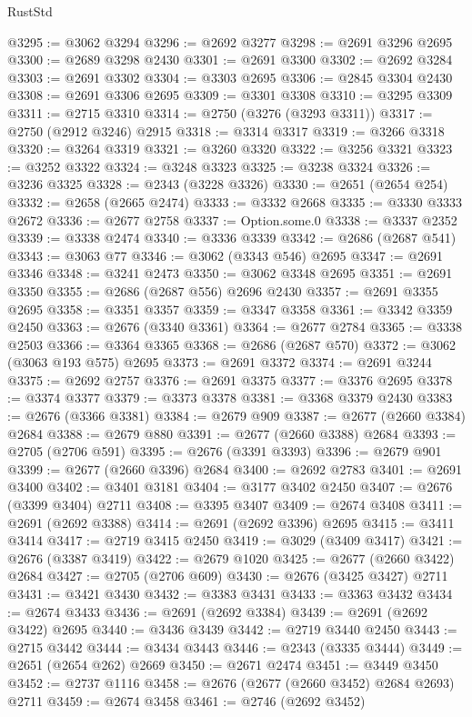 \begin{lexlean}{RustStd}
\begin{coremodule}
{\begin{coremodule}
{{{{{{{{{{{{{{{{{{{{{{{{{{{{{{{{{{{{{{{{{{{{{{{{{{{{{{{@3295 := @3062 @3294
@3296 := @2692 @3277
@3298 := @2691 @3296 @2695
@3300 := @2689 @3298 @2430
@3301 := @2691 @3300
@3302 := @2692 @3284
@3303 := @2691 @3302
@3304 := @3303 @2695
@3306 := @2845 @3304 @2430
@3308 := @2691 @3306 @2695
@3309 := @3301 @3308
@3310 := @3295 @3309
@3311 := @2715 @3310
@3314 := @2750 (@3276 (@3293 @3311))
@3317 := @2750 (@2912 @3246) @2915
@3318 := @3314 @3317
@3319 := @3266 @3318
@3320 := @3264 @3319
@3321 := @3260 @3320
@3322 := @3256 @3321
@3323 := @3252 @3322
@3324 := @3248 @3323
@3325 := @3238 @3324
@3326 := @3236 @3325
@3328 := @2343 (@3228 @3326)
@3330 := @2651 (@2654 @254)
@3332 := @2658 (@2665 @2474)
@3333 := @3332 @2668
@3335 := @3330 @3333 @2672
@3336 := @2677 @2758
@3337 := Option.some.{0}
@3338 := @3337 @2352
@3339 := @3338 @2474
@3340 := @3336 @3339
@3342 := @2686 (@2687 @541)
@3343 := @3063 @77
@3346 := @3062 (@3343 @546) @2695
@3347 := @2691 @3346
@3348 := @3241 @2473
@3350 := @3062 @3348 @2695
@3351 := @2691 @3350
@3355 := @2686 (@2687 @556) @2696 @2430
@3357 := @2691 @3355 @2695
@3358 := @3351 @3357
@3359 := @3347 @3358
@3361 := @3342 @3359 @2450
@3363 := @2676 (@3340 @3361)
@3364 := @2677 @2784
@3365 := @3338 @2503
@3366 := @3364 @3365
@3368 := @2686 (@2687 @570)
@3372 := @3062 (@3063 @193 @575) @2695
@3373 := @2691 @3372
@3374 := @2691 @3244
@3375 := @2692 @2757
@3376 := @2691 @3375
@3377 := @3376 @2695
@3378 := @3374 @3377
@3379 := @3373 @3378
@3381 := @3368 @3379 @2430
@3383 := @2676 (@3366 @3381)
@3384 := @2679 @909
@3387 := @2677 (@2660 @3384) @2684
@3388 := @2679 @880
@3391 := @2677 (@2660 @3388) @2684
@3393 := @2705 (@2706 @591)
@3395 := @2676 (@3391 @3393)
@3396 := @2679 @901
@3399 := @2677 (@2660 @3396) @2684
@3400 := @2692 @2783
@3401 := @2691 @3400
@3402 := @3401 @3181
@3404 := @3177 @3402 @2450
@3407 := @2676 (@3399 @3404) @2711
@3408 := @3395 @3407
@3409 := @2674 @3408
@3411 := @2691 (@2692 @3388)
@3414 := @2691 (@2692 @3396) @2695
@3415 := @3411 @3414
@3417 := @2719 @3415 @2450
@3419 := @3029 (@3409 @3417)
@3421 := @2676 (@3387 @3419)
@3422 := @2679 @1020
@3425 := @2677 (@2660 @3422) @2684
@3427 := @2705 (@2706 @609)
@3430 := @2676 (@3425 @3427) @2711
@3431 := @3421 @3430
@3432 := @3383 @3431
@3433 := @3363 @3432
@3434 := @2674 @3433
@3436 := @2691 (@2692 @3384)
@3439 := @2691 (@2692 @3422) @2695
@3440 := @3436 @3439
@3442 := @2719 @3440 @2450
@3443 := @2715 @3442
@3444 := @3434 @3443
@3446 := @2343 (@3335 @3444)
@3449 := @2651 (@2654 @262) @2669
@3450 := @2671 @2474
@3451 := @3449 @3450
@3452 := @2737 @1116
@3458 := @2676 (@2677 (@2660 @3452) @2684 @2693) @2711
@3459 := @2674 @3458
@3461 := @2746 (@2692 @3452)
}}}}}}}}}}}}}}}}}}}}}}}}}}}}}}}}}}}}}}}}}}}}}}}}}}}}}}}
\end{coremodule}}
\end{coremodule}
\end{lexlean}
